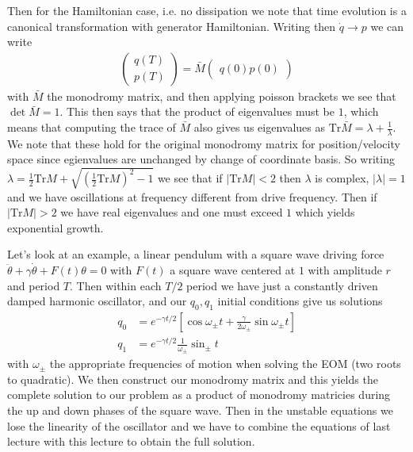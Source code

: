 \documentclass[10pt]{report}
\newcommand{\abs}[1]{\left|#1\right|}
\begin{document}
Then for the Hamiltonian case, i.e. no dissipation we note that time evolution is a canonical transformation with generator Hamiltonian. Writing then $\dot{q} \to p$ we can write
\begin{align}
    \begin{pmatrix} q(T)\\ p(T) \end{pmatrix} = \bar{M}\begin{pmatrix} q(0)p(0) \end{pmatrix} 
\end{align}
with $\bar{M}$ the monodromy matrix, and then applying poisson brackets we see that $\det \bar{M} = 1$. This then says that the product of eigenvalues must be $1$, which means that computing the trace of $\bar{M}$ also gives us eigenvalues as $\mathrm{Tr} \bar{M} = \lambda + \frac{1}{\lambda}$. We note that these hold for the original monodromy matrix for position/velocity space since egienvalues are unchanged by change of coordinate basis. So writing $\lambda = \frac{1}{2}\mathrm{Tr} M + \sqrt{\left( \frac{1}{2}\mathrm{Tr} M \right)^2 - 1}$ we see that if $\abs{\mathrm{Tr}M} < 2$ then $\lambda$ is complex, $\abs{\lambda} = 1$ and we have oscillations at frequency different from drive frequency. Then if $\abs{\mathrm{Tr}M} > 2$ we have real eigenvalues and one must exceed $1$ which yields exponential growth.

Let's look at an example, a linear pendulum with a square wave driving force $\ddot{\theta} + \gamma\dot{\theta} + F(t)\theta = 0$ with $F(t)$ a square wave centered at $1$ with amplitude $r$ and period $T$. Then within each $T/2$ period we have just a constantly driven damped harmonic oscillator, and our $q_0, q_1$ initial conditions give us solutions
\begin{align}
    q_0 &= e^{-\gamma t/2}\left[ \cos \omega_{\pm}t + \frac{\gamma}{2\omega_{\pm}}\sin \omega_{\pm}t \right]\\
    q_1 &= e^{-\gamma t/2}\frac{1}{\omega_{\pm}}\sin_{\pm}t
    \label{1.23.squaresolutions}
\end{align}
with $\omega_{\pm}$ the appropriate frequencies of motion when solving the EOM (two roots to quadratic). We then construct our monodromy matrix and this yields the complete solution to our problem as a product of monodromy matricies during the up and down phases of the square wave. Then in the unstable equations we lose the linearity of the oscillator and we have to combine the equations of last lecture with this lecture to obtain the full solution.
\end{document}
